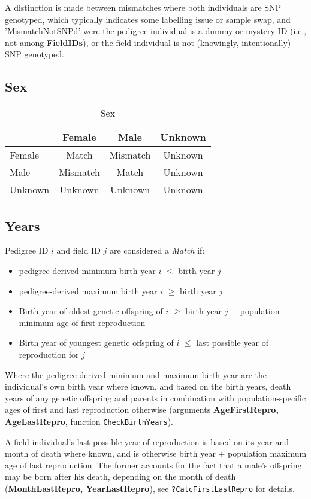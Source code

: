 \documentclass[a4paper, 12pt]{article}
\begin{document}
A distinction is made between mismatches where both individuals are SNP genotyped, which typically indicates some labelling issue or sample swap, and 'MismatchNotSNPd'  were the pedigree individual is a dummy or mystery ID (i.e., not among {\bfseries FieldIDs}), or the field individual is not (knowingly, intentionally) SNP genotyped.

\subsection{Sex}
\begin{table}[htbp]
\caption{Sex}
	\centering
		\begin{tabular}{l|ccc}
			\hline
			 & Female & Male & Unknown \\
			\hline
			Female & Match & Mismatch & Unknown \\
			Male & Mismatch & Match & Unknown \\
			Unknown & Unknown & Unknown & Unknown \\
			\hline
		\end{tabular}
\end{table}


\subsection{Years}
Pedigree ID $i$ and field ID $j$ are considered a \emph{Match} if:
\begin{itemize}
	\item pedigree-derived minimum birth year $i$ $\leq$ birth year $j$
	\item pedigree-derived maximum birth year $i$ $\geq$ birth year $j$
	\item Birth year of oldest genetic offspring of $i$ $\geq$ birth year $j$ $+$ population minimum age of first reproduction
	\item Birth year of youngest genetic offspring of $i$ $\leq$ last possible year of reproduction for $j$
\end{itemize}

Where the pedigree-derived minimum and maximum birth year are the individual's own birth year where known, and based on the birth years, death years of any genetic offspring and parents in combination with population-specific ages of first and last reproduction otherwise (arguments {\bfseries AgeFirstRepro, AgeLastRepro}, function \verb+CheckBirthYears+).

A field individual's last possible year of reproduction is based on its year and month of death where known, and is otherwise birth year $+$ population maximum age of last reproduction. The former accounts for the fact that a male's offspring may be born after his death, depending on the month of death ({\bfseries MonthLastRepro, YearLastRepro}), see \verb+?CalcFirstLastRepro+ for details.
\end{document}
